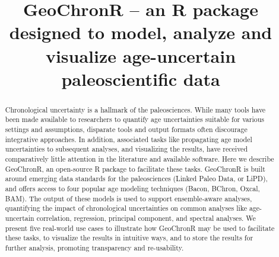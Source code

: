 \documentclass[gchron, manuscript]{copernicus}
\begin{document}
\title{GeoChronR -- an R package designed to model, analyze and visualize age-uncertain paleoscientific data}














\received{}
\pubdiscuss{} %
\revised{}
\accepted{}
\published{}




\maketitle


\begin{abstract}
Chronological uncertainty is a hallmark of the paleosciences. While many tools have been made available to researchers to quantify age uncertainties suitable for various settings and assumptions, disparate tools and output formats often discourage integrative approaches. In addition, associated tasks like propagating age model uncertainties to subsequent analyses, and visualizing the results, have received comparatively little attention in the literature and available software. Here we describe GeoChronR, an open-source R package to facilitate these tasks. GeoChronR is built around emerging data standards for the paleosciences (Linked Paleo Data, or LiPD), and offers access to four popular age modeling techniques (Bacon, BChron, Oxcal, BAM). The output of these models is used to support ensemble-aware analyses, quantifying the impact of chronological uncertainties on common analyses like age-uncertain correlation, regression, principal component, and spectral analyses. We present five real-world use cases to illustrate how GeoChronR may be used to facilitate these tasks, to visualize the results in intuitive ways, and to store the results for further analysis, promoting transparency and re-usability.
\end{abstract}
\end{document}
